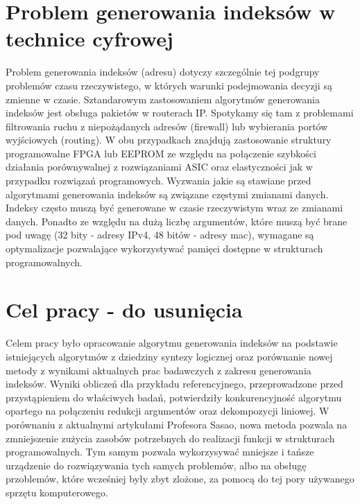 \section{Problem generowania indeksów w technice cyfrowej}

Problem generowania indeksów (adresu) dotyczy szczególnie tej podgrupy problemów czasu rzeczywistego,
w których warunki podejmowania decyzji są zmienne w czasie.
Sztandarowym zastosowaniem algorytmów generowania indeksów jest obsługa pakietów w routerach IP.
Spotykamy się tam z problemami filtrowania ruchu z niepożądanych adresów (firewall) lub wybierania portów wyjściowych (routing).
W obu przypadkach znajdują zastosowanie struktury programowalne FPGA lub EEPROM
ze względu na połączenie szybkości działania porównywalnej z rozwiązaniami ASIC oraz elastyczności jak w przypadku rozwiązań programowych.
Wyzwania jakie są stawiane przed algorytmami generowania indeksów są związane częstymi zmianami danych.
Indeksy często muszą być generowane w czasie rzeczywistym wraz ze zmianami danych.
Ponadto ze względu na dużą liczbę argumentów,
które muszą być brane pod uwagę (32 bity - adresy IPv4, 48 bitów - adresy mac),
wymagane są optymalizacje pozwalające wykorzystywać pamięci dostępne w strukturach programowalnych.

\section{Cel pracy - do usunięcia}

Celem pracy było opracowanie algorytmu generowania indeksów na podstawie istniejących algorytmów z dziedziny syntezy logicznej
oraz porównanie nowej metody z wynikami aktualnych prac badawczych z zakresu generowania indeksów.
Wyniki obliczeń dla przykładu referencyjnego,
przeprowadzone przed przystąpieniem do właściwych badań,
potwierdziły konkurencyjność algorytmu opartego na połączeniu redukcji argumentów oraz dekompozycji liniowej.
W porównaniu z aktualnymi artykułami Profesora Sasao,
nowa metoda pozwala na zmniejszenie zużycia zasobów potrzebnych do realizacji funkcji w strukturach programowalnych.
Tym samym pozwala wykorzysywać mniejsze i tańsze urządzenie do rozwiązywania tych samych problemów,
albo na obsługę przoblemów, które wcześniej były zbyt zlożone,
za pomocą do tej pory używanego sprzętu komputerowego.
